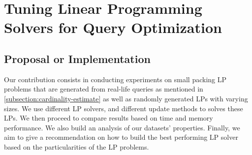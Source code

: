 \chapter{Tuning Linear Programming Solvers for Query Optimization}\label{chapter:linearprogramming}

\section{Proposal or Implementation}
Our contribution consists in conducting experiments on small packing LP problems that are generated from
real-life queries as mentioned in \ref{subsection:cardinality-estimate} as well as randomly generated
LPs with varying sizes. We use different LP solvers, and different update methods to solves these LPs.
We then proceed to compare results based on time and memory performance. We also build an analysis of our datasets' properties.
Finally, we aim to give a recommendation on how to build the best performing LP solver based on the
particularities of the LP problems.

